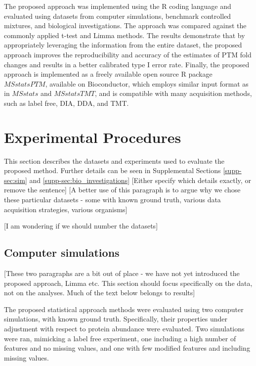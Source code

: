 \documentclass[mcp]{article}
\numberwithin{figure}{section} %
\numberwithin{table}{section}
\def\todo#1{{\color{red}[#1]}}
\begin{document}
The proposed approach was implemented using the R coding language and evaluated using datasets from computer simulations, benchmark controlled mixtures, and biological investigations. The approach was compared against the commonly applied t-test and Limma methods.\cite{Ritchie_15a} The results demonstrate that by appropriately leveraging the information from the entire dataset, the proposed approach improves the reproducibility and accuracy of the estimates of PTM fold changes and results in a better calibrated type I error rate. Finally, the proposed approach is implemented as a freely available open source R package $MSstatsPTM$, available on Bioconductor, which employs similar input format as in $MSstats$ and $MSstatsTMT$, and is compatible with many acquisition methods, such as label free, DIA, DDA, and TMT.\cite{Choi:2014} \cite{Huang:2020}

\section{Experimental Procedures}

This section describes the datasets and experiments used to evaluate the proposed method. Further details can be seen in Supplemental Sections \ref{supp-sec:sim} and \ref{supp-sec:bio_investigations} \todo{Either specify which details exactly, or remove the sentence} \todo{A better use of this paragraph is to argue why we chose these particular datasets - some with known ground truth, various data acquisition strategies, various organisms}

\todo{I am wondering if we should number the datasets}

\subsection*{Computer simulations}
\label{sec:comp_sim_procedure}

\todo{These two paragraphs are a bit out of place - we have not yet introduced the proposed approach, Limma etc. This section should focus specifically on the data, not on the analyses. Much of the text below belongs to results}

The proposed statistical approach methods were evaluated using two computer simulations, with known ground truth. Specifically, their properties under adjustment with respect to protein abundance were evaluated. Two simulations were ran, mimicking a label free experiment, one including a high number of features and no missing values, and one with few modified features and including missing values.
\end{document}
